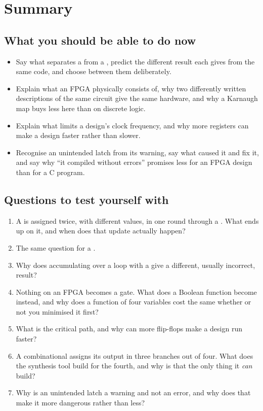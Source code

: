 
\section{Summary}
\label{c5:sec:review}

\subsection*{What you should be able to do now}
\begin{itemize}
  \item Say what separates a  from a , predict the different result
    each gives from the same code, and choose between them deliberately.
  \item Explain what an FPGA physically consists of, why two differently written descriptions of
    the same circuit give the same hardware, and why a Karnaugh map buys less here than on discrete
    logic.
  \item Explain what limits a design's clock frequency, and why more registers can make a design
    faster rather than slower.
  \item Recognise an unintended latch from its warning, say what caused it and fix it, and say why
    ``it compiled without errors'' promises less for an FPGA design than for a C program.
\end{itemize}

\subsection*{Questions to test yourself with}
\begin{enumerate}
  \item A  is assigned twice, with different values, in one round through a
    . What ends up on it, and when does that update actually happen?
  \item The same question for a .
  \item Why does accumulating over a loop with a  give a different, usually incorrect,
    result?
  \item Nothing on an FPGA becomes a gate. What does a Boolean function become instead, and why
    does a function of four variables cost the same whether or not you minimised it first?
  \item What is the critical path, and why can more flip-flops make a design run faster?
  \item A combinational  assigns its output in three branches out of four. What does the
    synthesis tool build for the fourth, and why is that the only thing it \emph{can} build?
  \item Why is an unintended latch a warning and not an error, and why does that make it more
    dangerous rather than less?
\end{enumerate}

